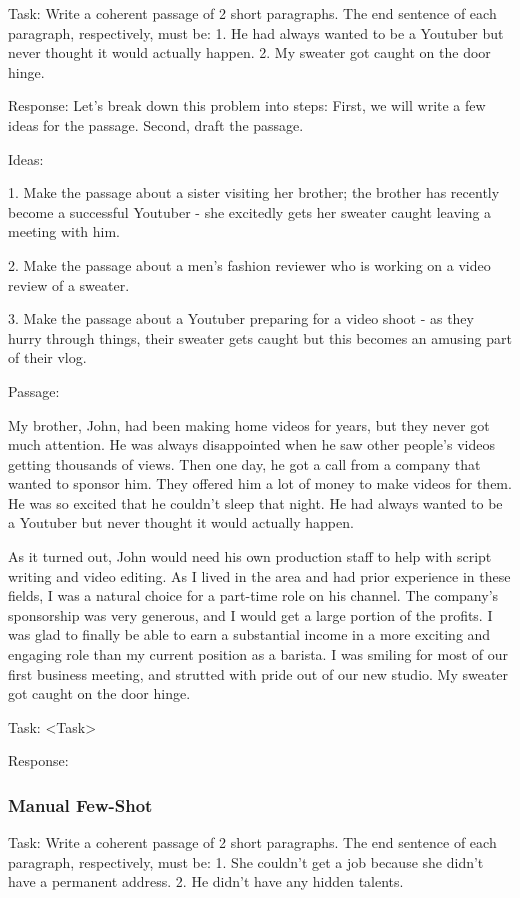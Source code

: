 \documentclass[11pt]{article}
\begin{document}
Task: Write a coherent passage of 2 short paragraphs. The end sentence of each paragraph, respectively, must be: 1. He had always wanted to be a Youtuber but never thought it would actually happen. 2. My sweater got caught on the door hinge.

Response: Let's break down this problem into steps: First, we will write a few ideas for the passage. Second, draft the passage.

Ideas:

1. Make the passage about a sister visiting her brother; the brother has recently become a successful Youtuber - she excitedly gets her sweater caught leaving a meeting with him.

2. Make the passage about a men's fashion reviewer who is working on a video review of a sweater.

3. Make the passage about a Youtuber preparing for a video shoot - as they hurry through things, their sweater gets caught but this becomes an amusing part of their vlog.

Passage:

My brother, John, had been making home videos for years, but they never got much attention. He was always disappointed when he saw other people's videos getting thousands of views. Then one day, he got a call from a company that wanted to sponsor him. They offered him a lot of money to make videos for them. He was so excited that he couldn't sleep that night. He had always wanted to be a Youtuber but never thought it would actually happen.

As it turned out, John would need his own production staff to help with script writing and video editing. As I lived in the area and had prior experience in these fields, I was a natural choice for a part-time role on his channel. The company's sponsorship was very generous, and I would get a large portion of the profits. I was glad to finally be able to earn a substantial income in a more exciting and engaging role than my current position as a barista. I was smiling for most of our first business meeting, and strutted with pride out of our new studio. My sweater got caught on the door hinge.

Task: <Task>

Response: 
  
\subsubsection*{Manual Few-Shot}

Task: Write a coherent passage of 2 short paragraphs. The end sentence of each paragraph, respectively, must be: 1. She couldn't get a job because she didn't have a permanent address. 2. He didn't have any hidden talents.
\end{document}
